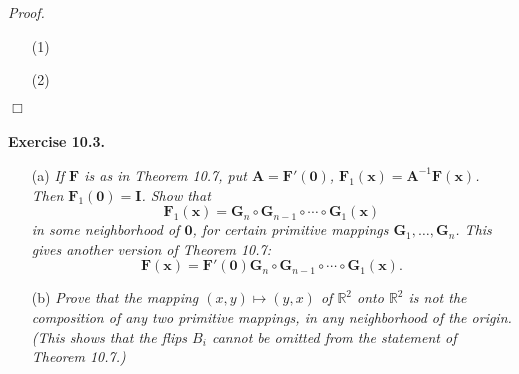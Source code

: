 \documentclass{article}
\begin{document}
\emph{Proof.}
\begin{enumerate}
\item[(1)]
\item[(2)]

\end{enumerate}
$\Box$ \\\\






\textbf{Exercise 10.3.}
\begin{enumerate}
\item[(a)]
  \emph{If $\mathbf{F}$ is as in Theorem 10.7,
  put $\mathbf{A} = \mathbf{F}'(\mathbf{0})$,
  $\mathbf{F}_1(\mathbf{x}) = \mathbf{A}^{-1} \mathbf{F}(\mathbf{x})$.
  Then $\mathbf{F}_1(\mathbf{0}) = \mathbf{I}$.
  Show that
  \[
    \mathbf{F}_1(\mathbf{x})
    = \mathbf{G}_{n} \circ \mathbf{G}_{n-1} \circ \cdots \circ \mathbf{G}_1(\mathbf{x})
  \]
  in some neighborhood of $\mathbf{0}$,
  for certain primitive mappings $\mathbf{G}_{1}, \ldots, \mathbf{G}_{n}$.
  This gives another version of Theorem 10.7:}
  \[
    \mathbf{F}(\mathbf{x})
    =
    \mathbf{F}'(\mathbf{0})
    \mathbf{G}_{n} \circ \mathbf{G}_{n-1} \circ \cdots \circ \mathbf{G}_1(\mathbf{x}).
  \]

\item[(b)]
  \emph{Prove that the mapping $(x,y) \mapsto (y,x)$ of $\mathbb{R}^2$ onto $\mathbb{R}^2$
  is not the composition of any two primitive mappings,
  in any neighborhood of the origin.
  (This shows that the flips $B_i$ cannot be omitted from the statement of Theorem 10.7.)} \\
\end{enumerate}
\end{document}

